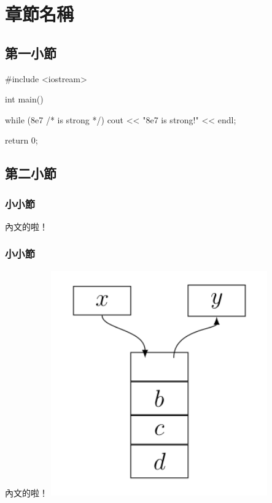 \chapter{章節名稱}

\section{第一小節}







\pagebreak

\begin{C++}
#include <iostream>

int main() {
	while (8e7 /* is strong */) {
		cout << "8e7 is strong!" << endl;
	}

	return 0;
}
\end{C++}

\section{第二小節}

\subsection{小小節}
內文的啦！

\subsection{小小節}
內文的啦！
\includegraphics*[width = 0.7\textwidth]{images/rails}
